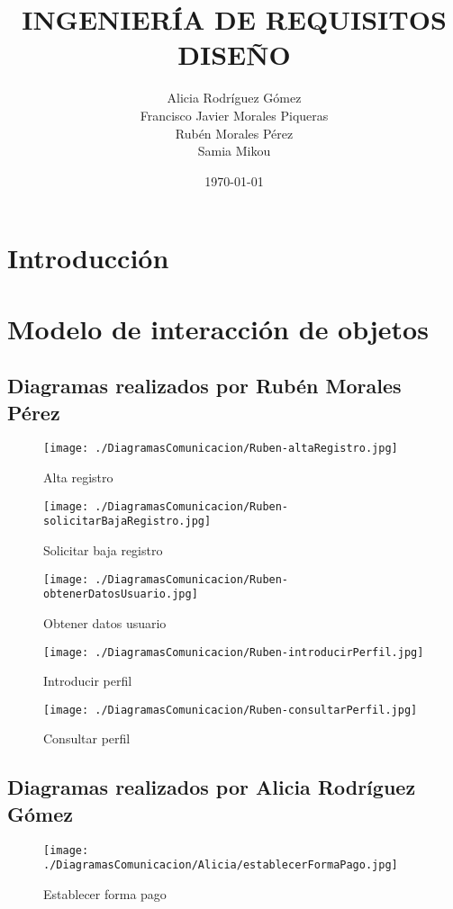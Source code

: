 \documentclass[11pt,spanish]{article} %
\title{INGENIERÍA DE REQUISITOS \\
	DISEÑO}
\author{Alicia Rodríguez Gómez \\
	Francisco Javier Morales Piqueras \\
	Rubén Morales Pérez \\
	Samia Mikou}
\date{\today}
\begin{document}
\maketitle
\tableofcontents %
\setlength\parindent{0pt} %


\section{Introducción}

\section{Modelo de interacción de objetos}
\subsection{Diagramas realizados por Rubén Morales Pérez}
\begin{figure}[H]
	\texttt{[image: ./DiagramasComunicacion/Ruben-altaRegistro.jpg]}
	\caption{Alta registro}
\end{figure}

\begin{figure}[H]
	\texttt{[image: ./DiagramasComunicacion/Ruben-solicitarBajaRegistro.jpg]}
	\caption{Solicitar baja registro}
\end{figure}

\begin{figure}[H]
	\texttt{[image: ./DiagramasComunicacion/Ruben-obtenerDatosUsuario.jpg]}
	\caption{Obtener datos usuario}
\end{figure}

\begin{figure}[H]
	\texttt{[image: ./DiagramasComunicacion/Ruben-introducirPerfil.jpg]}
	\caption{Introducir perfil}
\end{figure}

\begin{figure}[H]
	\texttt{[image: ./DiagramasComunicacion/Ruben-consultarPerfil.jpg]}
	\caption{Consultar perfil}
\end{figure}
\newpage


\subsection{Diagramas realizados por Alicia Rodríguez Gómez}
\begin{figure}[H]
	\texttt{[image: ./DiagramasComunicacion/Alicia/establecerFormaPago.jpg]}
	\caption{Establecer forma pago}
\end{figure}
\end{document}
